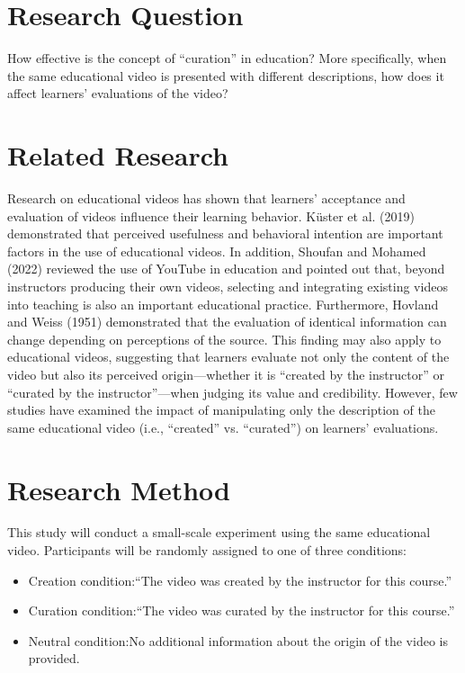 \documentclass[a4paper,11pt]{article}
\begin{document}
\section{Research Question}

How effective is the concept of “curation” in education?
More specifically, when the same educational video is presented with different descriptions, how does it affect learners’ evaluations of the video?

\section{Related Research}

Research on educational videos has shown that learners’ acceptance and evaluation of videos influence their learning behavior. Küster et al. (2019) demonstrated that perceived usefulness and behavioral intention are important factors in the use of educational videos.
In addition, Shoufan and Mohamed (2022) reviewed the use of YouTube in education and pointed out that, beyond instructors producing their own videos, selecting and integrating existing videos into teaching is also an important educational practice.
Furthermore, Hovland and Weiss (1951) demonstrated that the evaluation of identical information can change depending on perceptions of the source. This finding may also apply to educational videos, suggesting that learners evaluate not only the content of the video but also its perceived origin—whether it is “created by the instructor” or “curated by the instructor”—when judging its value and credibility.
However, few studies have examined the impact of manipulating only the description of the same educational video (i.e., “created” vs. “curated”) on learners’ evaluations.

\section{Research Method}

This study will conduct a small-scale experiment using the same educational video.
Participants will be randomly assigned to one of three conditions:

\begin{itemize}
  \item Creation condition:“The video was created by the instructor for this course.”
  \item Curation condition:“The video was curated by the instructor for this course.”
  \item Neutral condition:No additional information about the origin of the video is provided.
\end{itemize}
\end{document}
